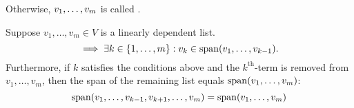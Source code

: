 \begin{mydef} 
  Otherwise, $v_1, \dots, v_m$ is called .
\end{mydef}




\setcounter{thm}{18}
\begin{thm} 
  \label{thm: linear dependence lemma}
  Suppose $v_{1}, \dots, v_{m}\in V$ is a linearly dependent list.
  \begin{equation}
    \implies \exists k \in \{ 1, \dots, m \} : v_k \in \operatorname{span} (v_1, \dots, v_{k-1}).
  \end{equation}
  Furthermore, if $k$ satisfies the conditions above and the $k^{\text{th}}$-term is removed from $v_1, \dots, v_m$, then the span of the remaining list equals $\operatorname{span} (v_1, \dots, v_{m})$:
  \begin{equation}
    \operatorname{span} (v_1, \dots, v_{k-1}, v_{k+1}, \dots, v_m) = \operatorname{span} (v_1, \dots, v_m)
  \end{equation}
\end{thm}

